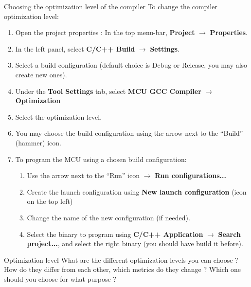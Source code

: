 \begin{bclogo}[couleur = gray!20, arrondi = 0.2, logo=\bcinfo]{Choosing the optimization level of the compiler}
	To change the compiler optimization level:
	\begin{enumerate}
		\item Open the project properties : In the top menu-bar, \textbf{Project} $\rightarrow$ \textbf{Properties}.
		\item In the left panel, select \textbf{C/C++ Build} $\rightarrow$ \textbf{Settings}.
		\item Select a build configuration (default choice is Debug or Release, you may also create new ones).
		\item Under the \textbf{Tool Settings} tab, select \textbf{MCU GCC Compiler} $\rightarrow$ \textbf{Optimization}
		\item Select the optimization level.
		\item You may choose the build configuration using the arrow next to the ``Build'' (hammer) icon.
		\item To program the MCU using a chosen build configuration:
		\begin{enumerate}
			\item Use the arrow next to the ``Run'' icon $\rightarrow$ \textbf{Run configurations...}
			\item Create the launch configuration using \textbf{New launch configuration} (icon on the top left)
			\item Change the name of the new configuration (if needed).
			\item Select the binary to program using \textbf{C/C++ Application}
			$\rightarrow$ \textbf{Search project...}, and select the right
			binary (you should have build it before).
		\end{enumerate}
	\end{enumerate}
\end{bclogo}

\begin{bclogo}[couleur = gray!20, arrondi = 0.2, logo=\bcquestion]{Optimization level}
    What are the different optimization levels you can choose ? How do they differ from each other, which metrics do they change ? Which one should you choose for what purpose ?
\end{bclogo}

